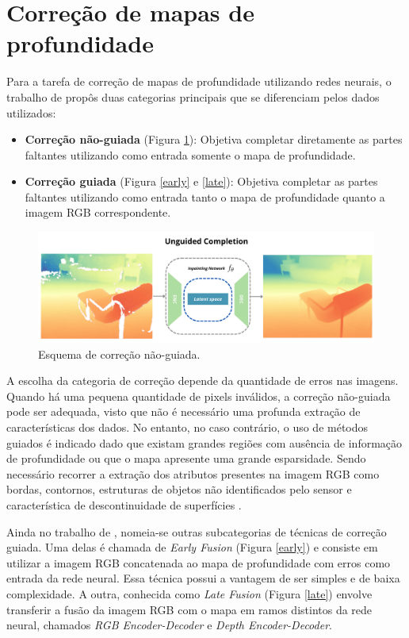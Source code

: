 \section{Correção de mapas de profundidade} 

Para a tarefa de correção de mapas de profundidade utilizando redes neurais, o trabalho de \cite{hu2022deep} propôs duas categorias principais que se diferenciam pelos dados utilizados:

\begin{itemize}
    \item \textbf{Correção não-guiada} (Figura \ref{ung}): Objetiva completar diretamente as partes faltantes utilizando como entrada somente o mapa de profundidade.
    \item \textbf{Correção guiada} (Figura \ref{early} e \ref{late}): Objetiva completar as partes faltantes utilizando como entrada tanto o mapa de profundidade quanto a imagem RGB correspondente.
\end{itemize}

\begin{figure}[h]
    \centering
    \includegraphics[width=\textwidth]{fig/unguided.png}
    \caption{Esquema de correção não-guiada.}
    \label{ung}
\end{figure}

A escolha da categoria de correção depende da quantidade de erros nas imagens. Quando há uma pequena quantidade de pixels inválidos, a correção não-guiada pode ser adequada, visto que não é necessário uma profunda extração de características dos dados. No entanto, no caso contrário, o uso de métodos guiados é indicado dado que existam grandes regiões com ausência de informação de profundidade ou que o mapa apresente uma grande esparsidade. Sendo necessário recorrer a extração dos atributos presentes na imagem RGB como bordas, contornos, estruturas de objetos não identificados pelo sensor e característica de descontinuidade de superfícies \cite{hu2022deep}.

Ainda no trabalho de \cite{hu2022deep}, nomeia-se outras subcategorias de técnicas de correção guiada. Uma delas é chamada de \textit{Early Fusion} (Figura \ref{early}) e consiste em utilizar a imagem RGB concatenada ao mapa de profundidade com erros como entrada da rede neural. Essa técnica possui a vantagem de ser simples e de baixa complexidade. A outra, conhecida como \textit{Late Fusion} (Figura \ref{late}) envolve transferir a fusão da imagem RGB com o mapa em ramos distintos da rede neural, chamados \textit{RGB Encoder-Decoder} e \textit{Depth Encoder-Decoder}.

